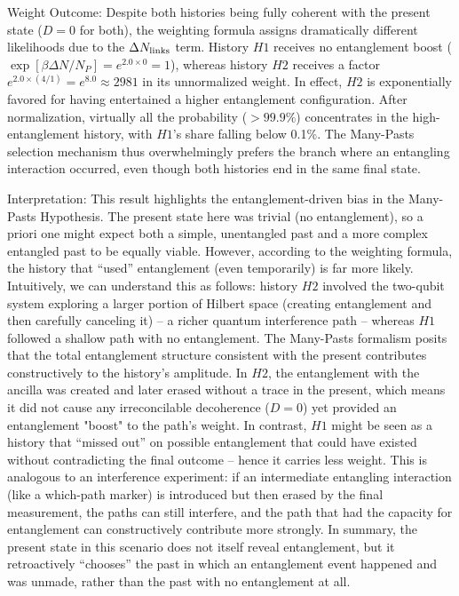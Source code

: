 \documentclass[11pt]{article}
\begin{document}
Weight Outcome: Despite both histories being fully coherent with the present state ($D=0$ for both), the weighting formula assigns dramatically different likelihoods due to the $\Delta N_{\rm links}$ term. History $H1$ receives no entanglement boost ($\exp[\beta \Delta N/N_P] = e^{2.0 \times 0} = 1$), whereas history $H2$ receives a factor $e^{2.0 \times (4/1)} = e^{8.0} \approx 2981$ in its unnormalized weight​. In effect, $H2$ is exponentially favored for having entertained a higher entanglement configuration. After normalization, virtually all the probability ($>99.9\%$) concentrates in the high-entanglement history, with $H1$’s share falling below 0.1\%​. The Many-Pasts selection mechanism thus overwhelmingly prefers the branch where an entangling interaction occurred, even though both histories end in the same final state.

Interpretation: This result highlights the entanglement-driven bias in the Many-Pasts Hypothesis. The present state here was trivial (no entanglement), so a priori one might expect both a simple, unentangled past and a more complex entangled past to be equally viable. However, according to the weighting formula, the history that “used” entanglement (even temporarily) is far more likely. Intuitively, we can understand this as follows: history $H2$ involved the two-qubit system exploring a larger portion of Hilbert space (creating entanglement and then carefully canceling it) – a richer quantum interference path – whereas $H1$ followed a shallow path with no entanglement. The Many-Pasts formalism posits that the total entanglement structure consistent with the present contributes constructively to the history’s amplitude. In $H2$, the entanglement with the ancilla was created and later erased without a trace in the present, which means it did not cause any irreconcilable decoherence ($D=0$) yet provided an entanglement "boost" to the path’s weight. In contrast, $H1$ might be seen as a history that “missed out” on possible entanglement that could have existed without contradicting the final outcome – hence it carries less weight. This is analogous to an interference experiment: if an intermediate entangling interaction (like a which-path marker) is introduced but then erased by the final measurement, the paths can still interfere, and the path that had the capacity for entanglement can constructively contribute more strongly. In summary, the present state in this scenario does not itself reveal entanglement, but it retroactively “chooses” the past in which an entanglement event happened and was unmade, rather than the past with no entanglement at all.
\end{document}
